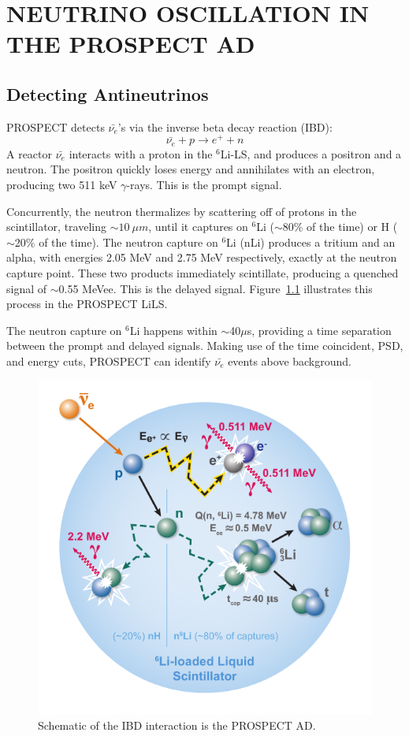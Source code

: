 \chapter{\uppercase{Neutrino Oscillation in the PROSPECT AD}}

\section{Detecting Antineutrinos}

PROSPECT detects $\bar{\nu_e}$'s via the inverse beta decay reaction (IBD):
\begin{equation}
	\bar{\nu_e} + p \rightarrow e^+ + n
\end{equation}
A reactor $\bar{\nu_e}$ interacts with a proton in the $^6$Li-LS, and produces a positron and a neutron.
The positron quickly loses energy and annihilates with an electron, producing two 511 keV $\gamma$-rays.
This is the prompt signal.

Concurrently, the neutron thermalizes by scattering off of protons in the scintillator, traveling $\sim10~\mu m$, until it captures on $^6$Li ($\sim$80\% of the time) or H ($\sim$20\% of the time).
The neutron capture on $^6$Li (nLi) produces a tritium and an alpha, with energies 2.05 MeV and 2.75 MeV respectively, exactly at the neutron capture point.
These two products immediately scintillate, producing a quenched signal of $\sim$0.55 MeVee.
This is the delayed signal.
Figure~\ref{fig:ibd} illustrates this process in the PROSPECT LiLS.

The neutron capture on $^6$Li happens within $\sim$40$\mu$s, providing a time separation between the prompt and delayed signals.
Making use of the time coincident, PSD, and energy cuts, PROSPECT can identify $\bar{\nu_e}$ events above background. 

\begin{figure}[!t]
	\centering
	\includegraphics[width=0.4\linewidth]{tex/7-oscillation-images/IBD}
	\caption{Schematic of the IBD interaction is the PROSPECT AD.}
	\label{fig:ibd}
\end{figure}

